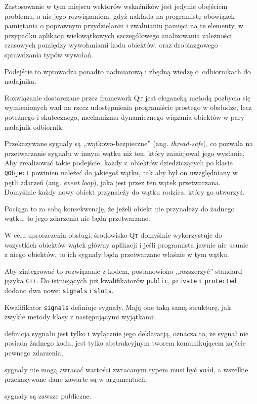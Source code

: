 Zastosowanie w tym miejscu wektorów wskaźników jest jedynie obejściem problemu, a nie jego rozwiązaniem, gdyż nakłada na programistę obowiązek pamiętania o poprawnym przydzielaniu i zwalnianiu pamięci na te elementy, w przypadku aplikacji wielowątkowych szczegółowego analizowania zależności czasowych pomiędzy wywołaniami kodu obiektów, oraz drobiazgowego sprawdzania typów wywołań.

Podejście to wprowadza ponadto nadmiarową i zbędną wiedzę o~odbiornikach do nadajnika.

Rozwiązanie dostarczane przez framework \textsc{Qt} jest elegancką metodą pozbycia się wymienionych wad na rzecz udostępnienia programiście prostego w obsłudze, lecz potężnego i skutecznego, mechanizmu dynamicznego wiązania obiektów w pary nadajnik-odbiornik.

Przekazywane sygnały są ,,wątkowo-bezpieczne'' (ang. \textsl{thread-safe}), co pozwala na przetwarzanie sygnału w innym wątku niż ten, który zainicjował jego wysłanie.
Aby zrealizować takie podejście, każdy z~obiektów dziedziczących po klasie \verb|QObject| powinien należeć do jakiegoś wątku, tak aby był on uwzględniany w pętli zdarzeń (ang. \textsl{event loop}), jaka jest przez ten wątek przetwarzana.
Domyślnie każdy nowy obiekt przynależy do wątku rodzica, który go utworzył.

Pociąga to za sobą konsekwencję, że jeżeli obiekt nie przynależy do żadnego wątku, to jego zdarzenia nie będą przetwarzane.

W celu uproszczenia obsługi, środowisko \textsc{Qt} domyślnie wykorzystuje do wszystkich obiektów wątek główny aplikacji i jeśli programista jawnie nie usunie z niego obiektów, to ich sygnały będą przetwarzane właśnie w tym wątku.

Aby zintegrować to rozwiązanie z kodem, postanowiono ,,rozszerzyć'' standard języka \verb|C++|.
Do istniejących już kwalifikatorów \verb|public|, \verb|private| i~\verb|protected| dodano dwa nowe: \verb|signals| i \verb|slots|.

Kwalifikator \verb|signals| definiuje sygnały. Mają one taką samą strukturę, jak zwykłe metody klasy z następującymi wyjątkami:
\begin{aenumerate}
  \item definicja sygnału jest tylko i wyłącznie jego deklaracją, oznacza to, że sygnał nie posiada żadnego kodu, jest tylko abstrakcyjnym tworem komunikującem zajście pewnego zdarzenia,
  \item sygnały nie mogą zwracać wartości \ppauza zwracanym typem musi być \verb|void|, a wszelkie przekazywane dane zawarte są w argumentach,
  \item sygnały są zawsze publiczne.
\end{aenumerate}


